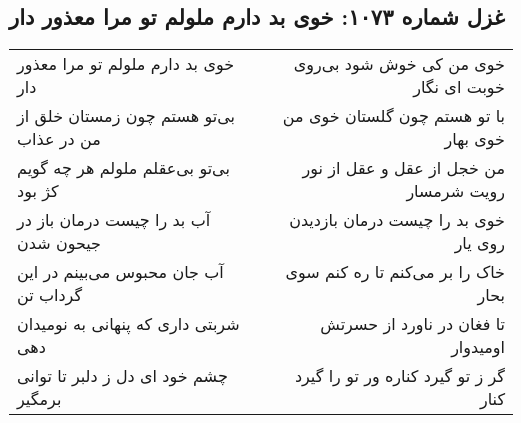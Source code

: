\begin{center}
\section*{غزل شماره ۱۰۷۳: خوی بد دارم ملولم تو مرا معذور دار}
\label{sec:1073}
\begin{longtable}{l p{0.5cm} r}
خوی بد دارم ملولم تو مرا معذور دار
&&
خوی من کی خوش شود بی‌روی خوبت ای نگار
\\
بی‌تو هستم چون زمستان خلق از من در عذاب
&&
با تو هستم چون گلستان خوی من خوی بهار
\\
بی‌تو بی‌عقلم ملولم هر چه گویم کژ بود
&&
من خجل از عقل و عقل از نور رویت شرمسار
\\
آب بد را چیست درمان باز در جیحون شدن
&&
خوی بد را چیست درمان بازدیدن روی یار
\\
آب جان محبوس می‌بینم در این گرداب تن
&&
خاک را بر می‌کنم تا ره کنم سوی بحار
\\
شربتی داری که پنهانی به نومیدان دهی
&&
تا فغان در ناورد از حسرتش اومیدوار
\\
چشم خود ای دل ز دلبر تا توانی برمگیر
&&
گر ز تو گیرد کناره ور تو را گیرد کنار
\\
\end{longtable}
\end{center}
